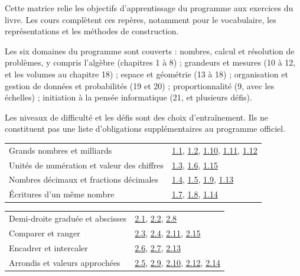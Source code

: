 \clearpage{}\label{couverture-programme}\gdef\otChapNum{0}\pagestyle{otFront}
Cette matrice relie les objectifs d’apprentissage du programme aux
exercices du livre. Les cours complètent ces repères, notamment pour
le vocabulaire, les représentations et les méthodes de construction.\par\bigskip
Les six domaines du programme sont couverts : nombres, calcul et
résolution de problèmes, y compris l’algèbre (chapitres 1 à 8) ;
grandeurs et mesures (10 à 12, et les volumes au chapitre 18) ; espace et
géométrie (13 à 18) ; organisation et gestion de données et probabilités
(19 et 20) ; proportionnalité (9, avec les échelles) ; initiation à la
pensée informatique (21, et plusieurs défis).\par\bigskip
\begin{attention}Les niveaux de difficulté et les défis sont des choix
d’entraînement. Ils ne constituent pas une liste d’obligations
supplémentaires au programme officiel.\end{attention}\clearpage
{}\fontsize{10}{13}\selectfont
{}\begin{tabularx}{\linewidth}{@{}Yl@{}}\toprule
Grands nombres et milliards & \hyperref[exo-1-1]{1.1}, \hyperref[exo-1-2]{1.2}, \hyperref[exo-1-10]{1.10}, \hyperref[exo-1-11]{1.11}, \hyperref[exo-1-12]{1.12}\\[2mm]
Unités de numération et valeur des chiffres & \hyperref[exo-1-3]{1.3}, \hyperref[exo-1-6]{1.6}, \hyperref[exo-1-15]{1.15}\\[2mm]
Nombres décimaux et fractions décimales & \hyperref[exo-1-4]{1.4}, \hyperref[exo-1-5]{1.5}, \hyperref[exo-1-9]{1.9}, \hyperref[exo-1-13]{1.13}\\[2mm]
Écritures d’un même nombre & \hyperref[exo-1-7]{1.7}, \hyperref[exo-1-8]{1.8}, \hyperref[exo-1-14]{1.14}\\[2mm]
\bottomrule\end{tabularx}\par\vspace{4mm}
\begin{tabularx}{\linewidth}{@{}Yl@{}}\toprule
Demi-droite graduée et abscisses & \hyperref[exo-2-1]{2.1}, \hyperref[exo-2-2]{2.2}, \hyperref[exo-2-8]{2.8}\\[2mm]
Comparer et ranger & \hyperref[exo-2-3]{2.3}, \hyperref[exo-2-4]{2.4}, \hyperref[exo-2-11]{2.11}, \hyperref[exo-2-15]{2.15}\\[2mm]
Encadrer et intercaler & \hyperref[exo-2-6]{2.6}, \hyperref[exo-2-7]{2.7}, \hyperref[exo-2-13]{2.13}\\[2mm]
Arrondis et valeurs approchées & \hyperref[exo-2-5]{2.5}, \hyperref[exo-2-9]{2.9}, \hyperref[exo-2-10]{2.10}, \hyperref[exo-2-12]{2.12}, \hyperref[exo-2-14]{2.14}\\[2mm]
\bottomrule\end{tabularx}\par\vspace{4mm}
